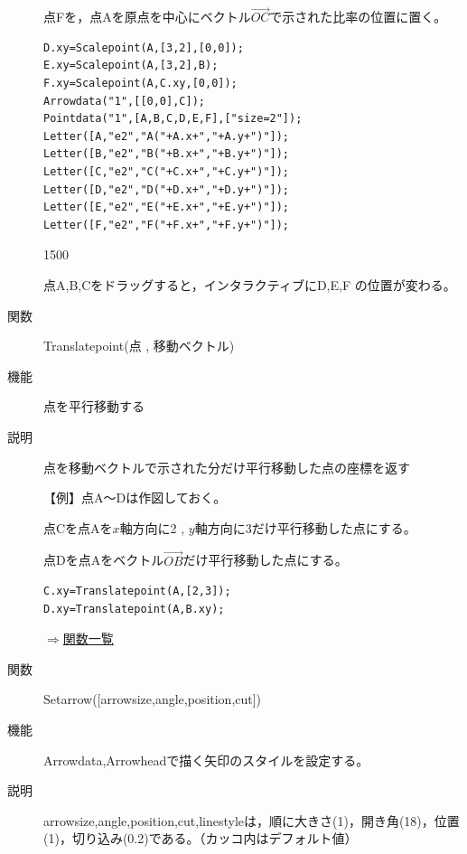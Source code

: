 \documentclass[papersize,a4paper,10pt,uplatex]{jsarticle}
\begin{document}
\begin{description}
点Fを，点Aを原点を中心にベクトル$\overrightarrow{OC} $で示された比率の位置に置く。
\vspace{-2mm}

\begin{verbatim}
D.xy=Scalepoint(A,[3,2],[0,0]);
E.xy=Scalepoint(A,[3,2],B);
F.xy=Scalepoint(A,C.xy,[0,0]);
Arrowdata("1",[[0,0],C]);
Pointdata("1",[A,B,C,D,E,F],["size=2"]);
Letter([A,"e2","A("+A.x+","+A.y+")"]);
Letter([B,"e2","B("+B.x+","+B.y+")"]);
Letter([C,"e2","C("+C.x+","+C.y+")"]);
Letter([D,"e2","D("+D.x+","+D.y+")"]);
Letter([E,"e2","E("+E.x+","+E.y+")"]);
Letter([F,"e2","F("+F.x+","+F.y+")"]);
\end{verbatim}
\vspace{\baselineskip}

\begin{layer}{150}{0}
\end{layer}

\vspace{40mm}

点A,B,Cをドラッグすると，インタラクティブにD,E,F の位置が変わる。

\vspace{\baselineskip}
\hypertarget{translatepoint}{}
\item[関数]Translatepoint(点 , 移動ベクトル)
\item[機能]点を平行移動する
\item[説明]点を移動ベクトルで示された分だけ平行移動した点の座標を返す

\vspace{\baselineskip}
【例】点A〜Dは作図しておく。

点Cを点Aを$x$軸方向に2 , $y$軸方向に3だけ平行移動した点にする。

点Dを点Aをベクトル$\overrightarrow{OB} $だけ平行移動した点にする。
\begin{verbatim}
C.xy=Translatepoint(A,[2,3]);
D.xy=Translatepoint(A,B.xy);
\end{verbatim}

\hspace{20mm} \scalebox{0.9}{}

\begin{flushright}\hyperlink{functionlist}{$\Rightarrow$関数一覧}\end{flushright}

\vspace{\baselineskip}
\hypertarget{setarrow}{}
\item[関数]Setarrow([arrowsize,angle,position,cut])
\item[機能]Arrowdata,Arrowheadで描く矢印のスタイルを設定する。
\item[説明]arrowsize,angle,position,cut,linestyleは，順に大きさ(1)，開き角(18)，位置(1)，切り込み(0.2)である。（カッコ内はデフォルト値）


\end{description}
\end{document}
